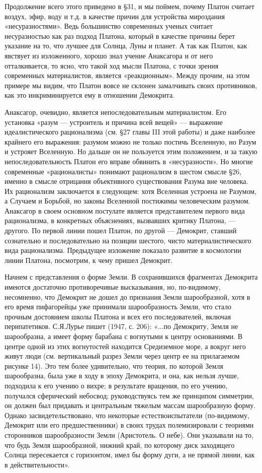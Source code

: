 Продолжение всего этого приведено в §31, и мы поймем, почему
Платон считает воздух, эфир, воду и т.д. в качестве причин для
устройства мироздания «несуразностями». Ведь большинство современных
ученых считает несуразностью как раз подход Платона, который в
качестве причины берет указание на то, что лучшее для Солнца, Луны и
планет. А так как Платон, как явствует из изложенного, хорошо знал
учение Анаксагора и от него отталкивается, то ясно, что такой ход
мысли Платона, с точки зрения современных материалистов, является
«реакционным». Между прочим, на этом примере мы видим, что Платон
вовсе не склонен замалчивать своих противников, как это
инкриминируется ему в отношении Демокрита.

Анаксагор, очевидно, является непоследовательным материалистом. Его
установка «разум --- устроитель и причина всей вещей» --- выражение
идеалистического рационализма (см. §27 главы III этой работы) и даже
наиболее крайнего его выражения: разумом можно не только постичь
Вселенную, но Разум и устрояет Вселенную. Но дальше он не пользуется
этим положением, и за такую непоследовательность Платон его вправе
обвинить в «несуразности». Но многие современные «рационалисты»
понимают рационализм в шестом смысле §26, именно в смысле отрицания
объективного существования Разума вне человека. Их рационализм
заключается в следующем: хотя Вселенная устроена не Разумом, а Случаем
и Борьбой, но законы Вселенной постижимы человеческим разумом.
Анаксагор в своем основном постулате является представителем первого
вида рационализма, в конкретных объяснениях, вызвавших критику
Платона, --- другого. По первой линии пошел Платон, по другой ---
Демокрит, ставший сознательно и последовательно на позиции шестого,
чисто материалистического вида рационализма. Предыдущее изложение
показало развитие в космологии линии Платона, посмотрим, к чему пришел
Демокрит.

Начнем с представления о форме Земли. В сохранившихся фрагментах
Демокрита имеются достаточно противоречивые высказывания, но,
по-видимому, несомненно, что Демокрит не дошел до признания Земли
шарообразной, хотя в его время пифагорейцы уже принимали
шарообразность Земли, что стало прочным достоянием школы Платона и
всех его последователей, включая перипатетиков. С.Я.Лурье пишет (1947,
с. 206): «...по Демокриту, Земля не шарообразна, а имеет форму
барабана с вогнутыми к центру основаниями. В центре одной из этих
вогнутостей находится Средиземное море, а вокруг него живут люди (см.
вертикальный разрез Земли через центр ее на прилагаемом рисунке 14).
Это тем более удивительно, что теория, по которой Земля шарообразна,
была уже в ходу в эпоху Демокрита, и она, как нельзя лучше, подходила
к его учению о вихре; в результате вращения, по его учению, получался
сферический небосвод; руководствуясь тем же принципом симметрии, он
должен был придавать и центральным тяжелым массам шарообразную форму.
Однако засвидетельствовано, что некоторые естествоиспытатели
(по-видимому, Демокрит или его предшественники) в своих трудах
полемизировали с теориями сторонников шарообразности Земли
(Аристотель. О небе). Они указывали на то, что будь Земля
шарообразной, нижний край, по которому диск заходящего Солнца
пересекается с горизонтом, имел бы форму дуги, а не прямой линии, как
в действительности».

